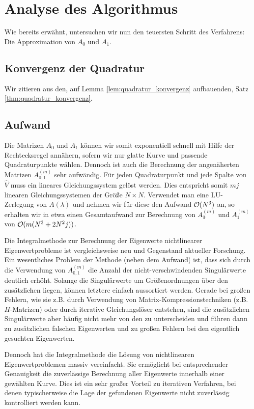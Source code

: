 \chapter{Analyse des Algorithmus}

Wie bereits erwähnt, untersuchen wir nun den teuersten Schritt des Verfahrens:
Die Approximation von $A_0$ und $A_1$.


\section{Konvergenz der Quadratur}



Wir zitieren aus \cite{EWPs} den, auf Lemma \ref{lem:quadratur_konvergenz} aufbauenden, Satz \ref{thm:quadratur_konvergenz}.



\section{Aufwand}

Die Matrizen $A_0$ und $A_1$ können wir somit exponentiell schnell mit Hilfe der Rechtecksregel annähern, sofern wir nur glatte Kurve und passende Quadraturpunkte wählen.
Dennoch ist auch die Berechnung der angenäherten Matrizen $A_{0, 1}^{(m)}$ sehr aufwändig.
Für jeden Quadraturpunkt und jede Spalte von $\hat V$ muss ein lineares Gleichungssystem gelöst werden.
Dies entspricht somit $m j$ linearen Gleichungssystemen der Größe $N \times N$.
Verwendet man eine LU-Zerlegung von $A(\lambda)$ und nehmen wir für diese den Aufwand $\mathcal{O}(N^3)$ an, so erhalten wir in etwa einen Gesamtaufwand zur Berechnung von $A_0^{(m)}$ und $A_1^{(m)}$ von $\mathcal{O}(m (N^3 + 2 N^2 j))$.

Die Integralmethode zur Berechnung der Eigenwerte nichtlinearer Eigenwertprobleme ist vergleichsweise neu und Gegenstand aktueller Forschung.
Ein wesentliches Problem der Methode (neben dem Aufwand) ist, dass sich durch die Verwendung von $A_{0, 1}^{(m)}$ die Anzahl der nicht-verschwindenden Singulärwerte deutlich erhöht.
Solange die  Singulärwerte um Größenordnungen über den zusätzlichen liegen, können letztere einfach aussortiert werden.
Gerade bei großen Fehlern, wie sie z.B. durch Verwendung von Matrix-Kompressionstechniken (z.B. $H$-Matrizen) oder durch iterative Gleichungslöser entstehen, sind die zusätzlichen Singulärwerte aber häufig nicht mehr von den  zu unterscheiden und führen dann zu zusätzlichen falschen Eigenwerten und zu großen Fehlern bei den eigentlich gesuchten Eigenwerten.

Dennoch hat die Integralmethode die Lösung von nichtlinearen Eigenwertproblemen massiv vereinfacht.
Sie ermöglicht bei entsprechender Genauigkeit die zuverlässige Berechnung aller Eigenwerte innerhalb einer gewählten Kurve.
Dies ist ein sehr großer Vorteil zu iterativen Verfahren, bei denen typischerweise die Lage der gefundenen Eigenwerte nicht zuverlässig kontrolliert werden kann.
